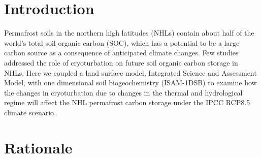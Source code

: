 \documentclass[portait,custom]{sciposter}
\begin{document}
\begin{multicols*}{4}

\section*{Introduction}

Permafrost soils in the northern high latitudes (NHLs) contain about half of the world's total soil organic carbon (SOC), which has a potential to be a large carbon source as a consequence of anticipated climate changes. Few studies addressed the role of cryoturbation on future soil organic carbon storage in NHLs. Here we coupled a land surface model, Integrated Science and Assessment Model, with one dimensional soil biogeochemistry (ISAM-1DSB) to examine how the changes in cryoturbation due to changes in the thermal and hydrological regime will affect the NHL permafrost carbon storage under the IPCC RCP8.5 climate scenario.

\section*{Rationale}


\end{multicols*}
\end{document}
